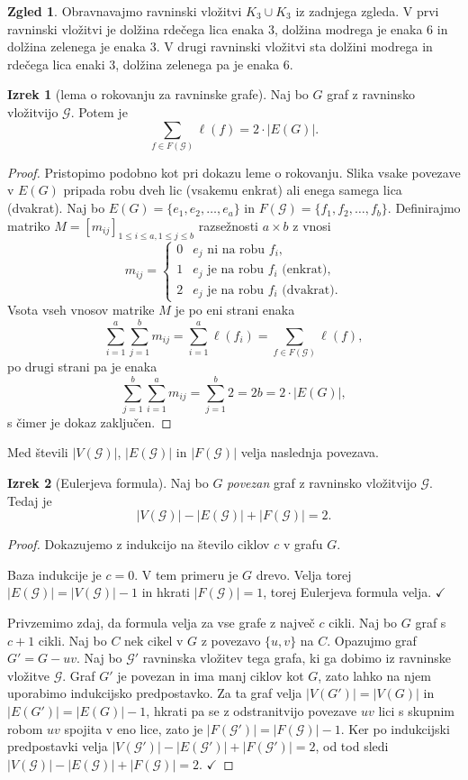 \documentclass[11pt]{book}
\def\GG{\mathcal{G}}
\def\kljuka{$\checkmark$}
\theoremstyle{definition}
\theoremstyle{zgled}
\newtheorem*{zgled}{Zgled}
\theoremstyle{odprtproblem}
\theoremstyle{domacanaloga}
\newenvironment{dokaz}
    {\color{siva}\begin{proof}}
    {\end{proof}}
\theoremstyle{izrek}
\newtheorem*{izrek}{Izrek}
\begin{document}
\begin{zgled}
Obravnavajmo ravninski vložitvi $K_3 \cup K_3$ iz zadnjega zgleda. V prvi ravninski vložitvi je dolžina rdečega lica enaka $3$, dolžina modrega je enaka $6$ in dolžina zelenega je enaka $3$. V drugi ravninski vložitvi sta dolžini modrega in rdečega lica enaki $3$, dolžina zelenega pa je enaka $6$.
\end{zgled}

\begin{izrek}[lema o rokovanju za ravninske grafe]
    Naj bo $G$ graf z ravninsko vložitvijo $\GG$. Potem je
    \[
        \sum_{f \in F(\GG)} \ell(f) = 2 \cdot |E(G)|.
    \]
\end{izrek}
\begin{dokaz}
Pristopimo podobno kot pri dokazu leme o rokovanju. Slika vsake povezave v $E(G)$ pripada robu dveh lic (vsakemu enkrat) ali enega samega lica (dvakrat). Naj bo $E(G) = \{ e_1, e_2, \dots, e_a \}$ in $F(\GG) = \{ f_1, f_2, \dots, f_b \}$. Definirajmo matriko $M = [m_{ij}]_{1 \leq i \leq a, 1 \leq j \leq b}$ razsežnosti $a \times b$ z vnosi
\[
    m_{ij} = \begin{cases}
        0 & \text{$e_j$ ni na robu $f_i$,} \\
        1 & \text{$e_j$ je na robu $f_i$ (enkrat),} \\
        2 & \text{$e_j$ je na robu $f_i$ (dvakrat).}
    \end{cases}
\]
Vsota vseh vnosov matrike $M$ je po eni strani enaka
\[
    \sum_{i = 1}^a \sum_{j = 1}^b m_{ij} = \sum_{i = 1}^a \ell(f_i) = \sum_{f \in F(\GG)} \ell(f),
\]
po drugi strani pa je enaka
\[
    \sum_{j = 1}^b \sum_{i = 1}^a  m_{ij} = \sum_{j = 1}^b 2 = 2b = 2 \cdot |E(G)|,
\]
s čimer je dokaz zaključen.
\end{dokaz}

Med števili $|V(\GG)|$, $|E(\GG)|$ in $|F(\GG)|$ velja naslednja povezava.

\begin{izrek}[Eulerjeva formula]
    Naj bo $G$ \emph{povezan} graf z ravninsko vložitvijo $\GG$. Tedaj je
    \[
        |V(\GG)| - |E(\GG)| + |F(\GG)| = 2.
    \]
\end{izrek}
\begin{dokaz}
Dokazujemo z indukcijo na število ciklov $c$ v grafu $G$.

Baza indukcije je $c = 0$. V tem primeru je $G$ drevo. Velja torej $|E(\GG)| = |V(\GG)| - 1$ in hkrati $|F(\GG)| = 1$, torej Eulerjeva formula velja. \kljuka

Privzemimo zdaj, da formula velja za vse grafe z največ $c$ cikli. Naj bo $G$ graf s $c+1$ cikli. Naj bo $C$ nek cikel v $G$ z povezavo $\{ u,v \}$ na $C$. Opazujmo graf $G' = G - uv$. Naj bo $\GG'$ ravninska vložitev tega grafa, ki ga dobimo iz ravninske vložitve $\GG$. Graf $G'$ je povezan in ima manj ciklov kot $G$, zato lahko na njem uporabimo indukcijsko predpostavko. Za ta graf velja $|V(G')| = |V(G)|$ in $|E(G')| = |E(G)| - 1$, hkrati pa se z odstranitvijo povezave $uv$ lici s skupnim robom $uv$ spojita v eno lice, zato je $|F(\GG')| = |F(\GG)| - 1$. Ker po indukcijski predpostavki velja $|V(\GG')| - |E(\GG')| + |F(\GG')| = 2$, od tod sledi $|V(\GG)| - |E(\GG)| + |F(\GG)| = 2$. \kljuka
\end{dokaz}
\end{document}
